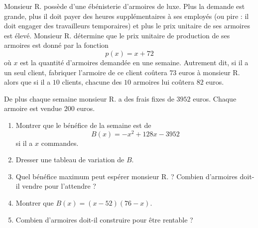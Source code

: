 
\begin{exercice}\label{exosmath-0399}

Monsieur R. possède d'une ébénisterie d'armoires de luxe. Plus la demande est grande, plus il doit payer des heures supplémentaires à ses employés (ou pire : il doit engager des travailleurs temporaires) et plus le prix unitaire de ses armoires est élevé. Monsieur R. détermine que le prix unitaire de production de ses armoires est donné par la fonction
\begin{equation*}
    p(x)=x+72
\end{equation*}
où \( x\) est la quantité d'armoires demandée en une semaine. Autrement dit, si il a un seul client, fabriquer l'armoire de ce client coûtera \( 73\) euros à monsieur R. alors que si il a \( 10\) clients, chacune des \( 10\) armoires lui coûtera \( 82\) euros.

De plus chaque semaine monsieur R. a des frais fixes de \( 3952\) euros. Chaque armoire est vendue \( 200\) euros.

\begin{enumerate}
    \item
        Montrer que le bénéfice de la semaine est de
        \begin{equation*}
            B(x)=-x^2+128x-3952
        \end{equation*}
        si il a \( x\) commandes.
    \item
        Dresser une tableau de variation de \( B\).
    \item
        Quel bénéfice maximum peut espérer monsieur R. ? Combien d'armoires doit-il vendre pour l'attendre ?
    \item
        Montrer que \( B(x)=(x-52)(76-x)\).
    \item
        Combien d'armoires doit-il construire pour être rentable ?
\end{enumerate}

\end{exercice}
